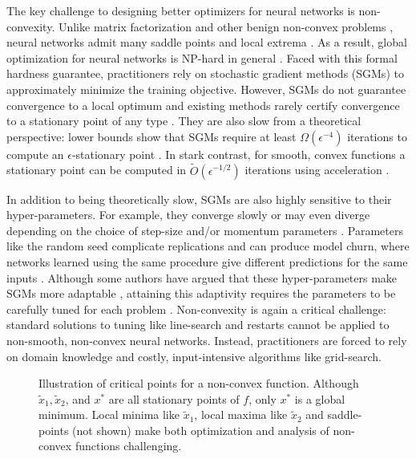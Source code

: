 The key challenge to designing better optimizers for neural networks is
non-convexity.
Unlike matrix factorization and other benign non-convex problems
\citep{burer2005low}, neural networks admit many saddle points and
local extrema \citep{safran2018local, dauphin2014saddles}.
As a result, global optimization for neural networks is NP-hard in general
\citep{froese2023hard, blum1988complete}.
Faced with this formal hardness guarantee, practitioners rely on stochastic
gradient methods (SGMs) to approximately minimize the training objective.
However, SGMs do not guarantee convergence to a local optimum \citep{ge2015escaping}
and existing methods rarely certify convergence to a stationary point of any
type \citep{goodfellow2016deeplearning}.
They are also slow from a theoretical perspective:
lower bounds show that SGMs require at least \( \Omega(\epsilon^{-4}) \) iterations
to compute an \( \epsilon \)-stationary point \citep{arjevani2023lower, drori2020complexity}.
In stark contrast, for smooth, convex functions a stationary point can be
computed in \( \tilde{O}(\epsilon^{-1/2}) \) iterations using acceleration
\citep{nesterov2018lectures}.

In addition to being theoretically slow, SGMs are also highly sensitive to
their hyper-parameters.
For example, they converge slowly or may even diverge depending on the choice
of step-size and/or momentum parameters \citep{zhang2022adam}.
Parameters like the random seed complicate replications and can produce model
churn, where networks learned using the same procedure give different
predictions for the same inputs \citep{henderson2018deep,
    bhojanapalli2021reproducibility}.
Although some authors have argued that these hyper-parameters make
SGMs more adaptable \citep{choi2019empirical}, attaining this adaptivity
requires the parameters to be carefully tuned for each problem
\citep{sivaprasad2020tuning}.
Non-convexity is again a critical challenge:
standard solutions to tuning like line-search
\citep{armijo1966ls} and restarts \citep{odonoghue2015restarts} cannot be
applied to non-smooth, non-convex neural networks.
Instead, practitioners are forced to rely on domain knowledge and costly,
input-intensive algorithms like grid-search.

\begin{figure}[t]
    \centering
    
    \caption{Illustration of critical points for a non-convex function.
        Although \( \tilde{x}_1, \tilde{x}_2 \), and \( x^* \) are all
        stationary points of \( f \), only \( x^* \) is a global minimum.
        Local minima like \( \tilde{x}_1 \), local maxima like \( \tilde{x}_2 \)
        and saddle-points (not shown) make both optimization and analysis
        of non-convex functions challenging.
    }%
    \label{fig:non-convex}
\end{figure}

